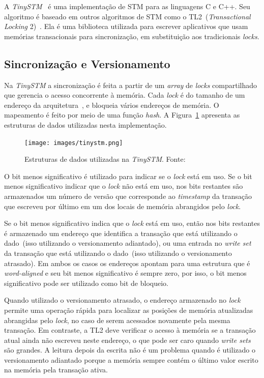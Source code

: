 \documentclass[diss,capa]{texufpel}
\begin{document}
A \emph{TinySTM}~\cite{TINY} é uma implementação de STM para as linguagens C e C++. Seu algoritmo é baseado em outros algoritmos de STM como o TL2~(\emph{Transactional Locking} 2)~\cite{tl2}. Ela é uma biblioteca utilizada para escrever aplicativos que usam memórias transacionais para sincronização, em substituição aos tradicionais \emph{locks}.

\subsection{Sincronização e Versionamento}

Na \emph{TinySTM} a sincronização é feita a partir de um \emph{array} de \emph{locks} compartilhado que gerencia o acesso concorrente à memória. Cada \emph{lock} é do tamanho de um endereço da arquitetura~\cite{TINY}, e bloqueia vários endereços de memória. O mapeamento é feito por meio de uma função \emph{hash}. A Figura~\ref{figurasincronisacaotinystm} apresenta as estruturas de dados utilizadas nesta implementação.

\begin{figure}[!htp]
\centering
\texttt{[image: images/tinystm.png]}
\caption{Estruturas de dados utilizadas na \emph{TinySTM}. Fonte:~\cite{TINY}}
\label{figurasincronisacaotinystm}
\end{figure}

O bit menos significativo é utilizado para indicar se o \emph{lock} está em uso. Se o bit menos significativo indicar que o \emph{lock} não está em uso, nos bits restantes são armazenados um número de versão que corresponde ao \emph{timestamp} da transação que escreveu por último em um dos locais de memória abrangidos pelo \emph{lock}.

Se o bit menos significativo indica que o \emph{lock} está em uso, então nos bits restantes é armazenado um endereço que identifica a transação que está utilizando o dado~(isso utilizando o versionamento adiantado), ou uma entrada no \emph{write set} da transação que está utilizando o dado~(isso utilizando o versionamento atrasado). Em ambos os casos os endereços apontam para uma estrutura que é \emph{word-aligned} e seu bit menos significativo é sempre zero, por isso, o bit menos significativo pode ser utilizado como bit de bloqueio.

Quando utilizado o versionamento atrasado, o endereço armazenado no \emph{lock} permite uma operação rápida para localizar as posições de memória atualizadas abrangidas pelo \emph{lock}, no caso de serem acessados novamente pela mesma transação. Em contraste, a TL2 deve verificar o acesso à memória se a transação atual ainda não escreveu neste endereço, o que pode ser caro quando \emph{write sets} são grandes. A leitura depois da escrita não é um problema quando é utilizado o versionamento adiantado porque a memória sempre contém o último valor escrito na memória pela transação ativa.
\end{document}
